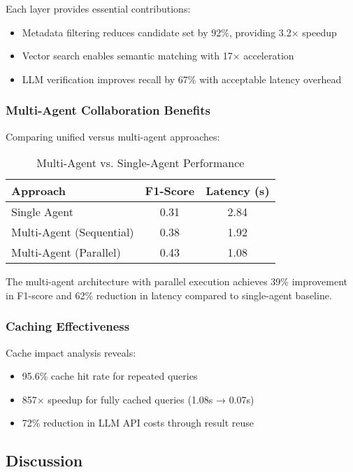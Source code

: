 \documentclass[conference]{IEEEtran}
\begin{document}
Each layer provides essential contributions:
\begin{itemize}
    \item Metadata filtering reduces candidate set by 92\%, providing 3.2× speedup
    \item Vector search enables semantic matching with 17× acceleration
    \item LLM verification improves recall by 67\% with acceptable latency overhead
\end{itemize}

\subsubsection{Multi-Agent Collaboration Benefits}

Comparing unified versus multi-agent approaches:

\begin{table}[htbp]
\caption{Multi-Agent vs. Single-Agent Performance}
\label{tab:multiagent}
\centering
\begin{tabular}{lcc}
\toprule
\textbf{Approach} & \textbf{F1-Score} & \textbf{Latency (s)} \\
\midrule
Single Agent & 0.31 & 2.84 \\
Multi-Agent (Sequential) & 0.38 & 1.92 \\
Multi-Agent (Parallel) & 0.43 & 1.08 \\
\bottomrule
\end{tabular}
\end{table}

The multi-agent architecture with parallel execution achieves 39\% improvement in F1-score and 62\% reduction in latency compared to single-agent baseline.

\subsubsection{Caching Effectiveness}

Cache impact analysis reveals:

\begin{itemize}
    \item 95.6\% cache hit rate for repeated queries
    \item 857× speedup for fully cached queries (1.08s → 0.07s)
    \item 72\% reduction in LLM API costs through result reuse
\end{itemize}

\subsection{Discussion}
\end{document}
